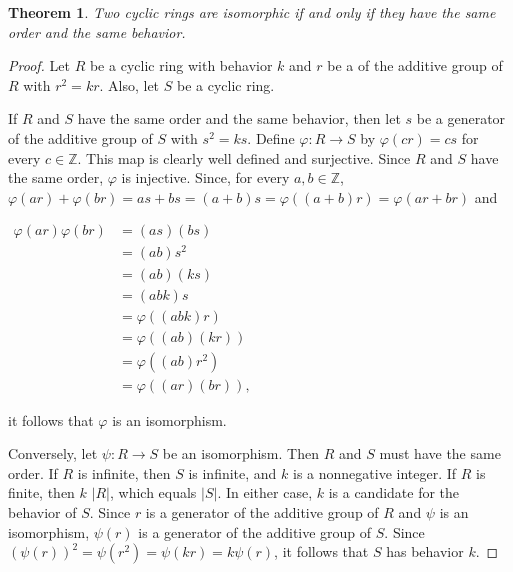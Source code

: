 \documentclass[12pt]{article}
\newtheorem*{thm*}{Theorem}
\begin{document}

\begin{thm*}
Two cyclic rings are isomorphic if and only if they have the same order and the same behavior.
\end{thm*}

\begin{proof}
Let $R$ be a cyclic ring with behavior $k$ and $r$ be a  of the additive group of $R$ with $r^2=kr$.  Also, let $S$ be a cyclic ring.

If $R$ and $S$ have the same order and the same behavior, then let $s$ be a generator of the additive group of $S$ with $s^2=ks$.  Define $\varphi \colon R \to S$ by $\varphi(cr)=cs$ for every $c \in \mathbb{Z}$.  This map is clearly well defined and surjective.  Since $R$ and $S$ have the same order, $\varphi$ is injective.  Since, for every $a,b \in \mathbb{Z}$, $\varphi(ar)+\varphi(br)=as+bs=(a+b)s=\varphi((a+b)r)=\varphi(ar+br)$ and

\begin{center}
$\begin{array}{rl}
\varphi(ar)\varphi(br) & =(as)(bs) \\
& =(ab)s^2 \\
& =(ab)(ks) \\
& =(abk)s \\
& =\varphi((abk)r) \\
& =\varphi((ab)(kr)) \\
& =\varphi((ab)r^2) \\
& =\varphi((ar)(br)), \end{array}$
\end{center}

it follows that $\varphi$ is an isomorphism.

Conversely, let $\psi \colon R \to S$ be an isomorphism.  Then $R$ and $S$ must have the same order.  If $R$ is infinite, then $S$ is infinite, and $k$ is a nonnegative integer.  If $R$ is finite, then $k$  $|R|$, which equals $|S|$.  In either case, $k$ is a candidate for the behavior of $S$.  Since $r$ is a generator of the additive group of $R$ and $\psi$ is an isomorphism, $\psi(r)$ is a generator of the additive group of $S$.  Since $(\psi(r))^2=\psi(r^2)=\psi(kr)=k\psi(r)$, it follows that $S$ has behavior $k$.
\end{proof}
\end{document}
